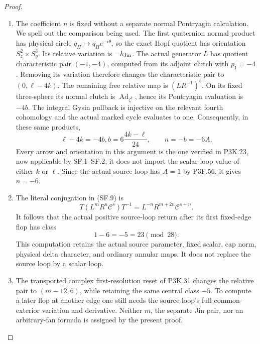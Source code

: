 \begin{proof}
\begin{enumerate}[label=\arabic*.]
\item The coefficient \(n\) is fixed without a separate normal
Pontryagin calculation. We spell out the comparison being used.
The first quaternion normal product has physical circle
\(q_H\mapsto q_He^{-i\theta}\), so the exact Hopf quotient has
orientation \(S^2_z\times S^3_y\). Its relative variation is
\(-k_{\rm Jin}\). The actual generator \(L\) has quotient
characteristic pair \((-1,-4)\), computed from its adjoint clutch
with \(p_1=-4\). Removing its variation therefore changes the
characteristic pair to \((0,\ell-4k)\). The remaining free relative
map is \((LR^{-1})^b\). On its fixed three-sphere its normal clutch
is \(\operatorname{Ad}_{\zeta^b}\), hence its Pontryagin evaluation
is \(-4b\). The integral Gysin pullback is injective on the relevant
fourth cohomology and the actual marked cycle evaluates to one.
Consequently, in these same products,
\[
           \ell-4k=-4b,
           b=6\frac{4k-\ell}{24},\qquad
           n=-b=-6A.                                    \tag{SF.10}
\]
Every arrow and orientation in this argument is the one verified in
P3K.23, now applicable by SF.1--SF.2; it does not import the scalar-loop
value of either \(k\) or \(\ell\). Since the actual source loop has
\(A=1\) by P3F.56, it gives \(n=-6\).

\item The literal conjugation in (SF.9) is
\[
 T(L^mR^n\mathcal C^s)T^{-1}
       =L^{-n}R^{m+2n}\mathcal C^{s+n}.                   \tag{SF.11}
\]
It follows that the actual positive source-loop return after its
first fixed-edge flop has class
\[
                          1-6=-5=23\pmod {28}.           \tag{SF.12}
\]
This computation retains the actual source parameter, fixed scalar,
cap norm, physical delta character, and ordinary annular maps. It
does not replace the source loop by a scalar loop.

\item The transported complex first-resolution reset of P3K.31 changes the
relative pair to \((m-12,6)\), while retaining the same central class
\(-5\). To compute a later flop at another edge one still needs the
source loop's full common-exterior variation and derivative. Neither
\(m\), the separate Jin pair, nor an arbitrary-fan formula is assigned
by the present proof.

\end{enumerate}
\end{proof}